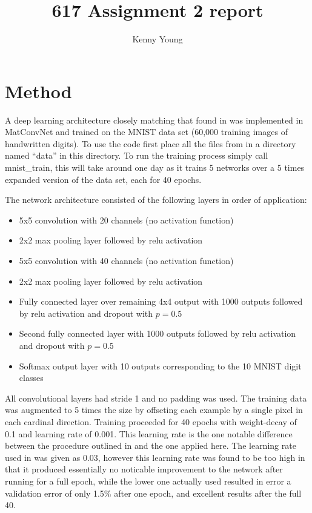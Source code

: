 \documentclass[a4paper,12pt]{article}
\title{617 Assignment 2 report}
\author{Kenny Young}
\begin{document}
\maketitle
\tableofcontents
\section{Method}
A deep learning architecture closely matching that found in \cite{SRC} was implemented in MatConvNet and trained on the MNIST data set (60,000 training images of handwritten digits). To use the code first place all the files from \cite{MNIST} in a directory named ``data'' in this directory. To run the training process simply call mnist\_train, this will take around one day as it trains 5 networks over a 5 times expanded version of the data set, each for 40 epochs.

The network architecture consisted of the following layers in order of application:
\begin{itemize}
\item 5x5 convolution with 20 channels (no activation function)
\item 2x2 max pooling layer followed by relu activation
\item 5x5 convolution with 40 channels (no activation function)
\item 2x2 max pooling layer followed by relu activation
\item Fully connected layer over remaining 4x4 output with 1000 outputs followed by relu activation and dropout with $p=0.5$
\item Second fully connected layer with 1000 outputs followed by relu activation and dropout with $p=0.5$
\item Softmax output layer with 10 outputs corresponding to the 10 MNIST digit classes
\end{itemize}

All convolutional layers had stride 1 and no padding was used. The training data was augmented to 5 times the size by offseting each example by a single pixel in each cardinal direction. Training proceeded for 40 epochs with weight-decay of 0.1 and learning rate of 0.001. This learning rate is the one notable difference between the procedure outlined in \cite{SRC} and the one applied here. The learning rate used in \cite{SRC} was given as 0.03, however this learning rate was found to be too high in that it produced essentially no noticable improvement to the network after running for a full epoch, while the lower one actually used resulted in error a validation error of only 1.5\% after one epoch, and excellent results after the full 40.
\end{document}
